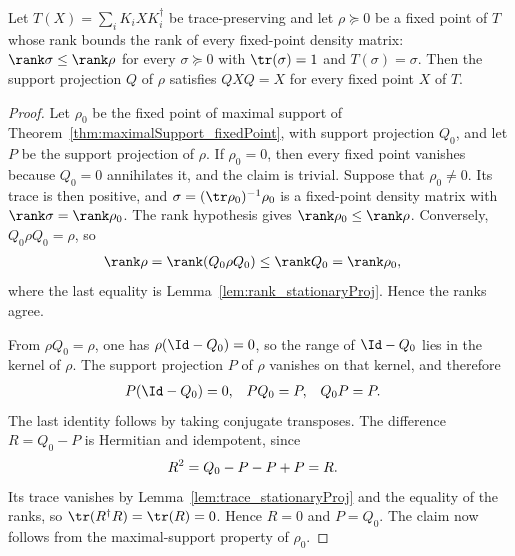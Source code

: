 \begin{theorem}%
    \label{thm:maximalSupport_of_maximalRank}
    \leanok
    Let $T(X)=\sum_iK_iXK_i^\dagger$ be trace-preserving and let
    $\rho\succeq0$ be a fixed point of $T$ whose rank bounds the rank of
    every fixed-point density matrix:
    $\rank\sigma\leq\rank\rho$ for every $\sigma\succeq0$ with
    $\tr(\sigma)=1$ and $T(\sigma)=\sigma$. Then the support projection $Q$
    of $\rho$ satisfies $QXQ=X$ for every fixed point $X$ of $T$.
\end{theorem}

\begin{proof}
    \leanok
    Let $\rho_0$ be the fixed point of maximal support of
    Theorem~\ref{thm:maximalSupport_fixedPoint}, with support projection
    $Q_0$, and let $P$ be the support projection of $\rho$. If $\rho_0=0$,
    then every fixed point vanishes because $Q_0=0$ annihilates it, and the
    claim is trivial. Suppose that $\rho_0\neq0$. Its trace is then
    positive, and $\sigma=(\tr\rho_0)^{-1}\rho_0$ is a fixed-point density
    matrix with $\rank\sigma=\rank\rho_0$. The rank hypothesis gives
    $\rank\rho_0\leq\rank\rho$. Conversely, $Q_0\rho Q_0=\rho$, so
    \begin{align}
        \rank\rho
        &=\rank(Q_0\rho Q_0)
          \leq\rank Q_0
          =\rank\rho_0,
        \notag
    \end{align}
    where the last equality is
    Lemma~\ref{lem:rank_stationaryProj}. Hence the ranks agree.

    From $\rho Q_0=\rho$, one has $\rho(\Id-Q_0)=0$, so the range of
    $\Id-Q_0$ lies in the kernel of $\rho$. The support projection $P$ of
    $\rho$ vanishes on that kernel, and therefore
    \begin{align}
        P(\Id-Q_0)&=0,
        &
        PQ_0&=P,
        &
        Q_0P&=P.
        \notag
    \end{align}
    The last identity follows by taking conjugate transposes. The difference
    $R=Q_0-P$ is Hermitian and idempotent, since
    \begin{align}
        R^2
        &=Q_0-P-P+P=R.
        \notag
    \end{align}
    Its trace vanishes by Lemma~\ref{lem:trace_stationaryProj} and the
    equality of the ranks, so $\tr(R^\dagger R)=\tr(R)=0$. Hence $R=0$ and
    $P=Q_0$. The claim now follows from the maximal-support property of
    $\rho_0$.
\end{proof}


